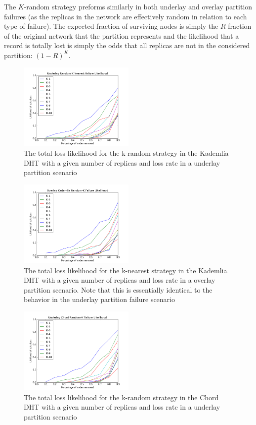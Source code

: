 The $K$-random strategy preforms similarly in both underlay and overlay partition failures (as the replicas in the network are effectively random in relation to each type of failure).
The expected fraction of surviving nodes is simply the $R$ fraction of the original network that the partition represents and the likelihood that a record is totally lost is simply the odds that all replicas are not in the considered partition: $(1-R)^{K}$. 

\begin{figure}[h!]
	\includegraphics[width=0.5\textwidth]{figs/underlay_kad_random}
	\caption{The total loss likelihood for the k-random strategy in the Kademlia DHT with a given number of replicas and loss rate in a underlay partition scenario}
\end{figure}
\begin{figure}[h!]
	\includegraphics[width=0.5\textwidth]{figs/overlay_kad_random}
	\caption{The total loss likelihood for the k-nearest strategy in the Kademlia DHT with a given number of replicas and loss rate in a overlay partition scenario. Note that this is essentially identical to the behavior in the underlay partition failure scenario}
\end{figure}
\begin{figure}[h!]
	\includegraphics[width=0.5\textwidth]{figs/underlay_chord_random}
	\caption{The total loss likelihood for the k-random strategy in the Chord DHT with a given number of replicas and loss rate in a underlay partition scenario}
\end{figure}
